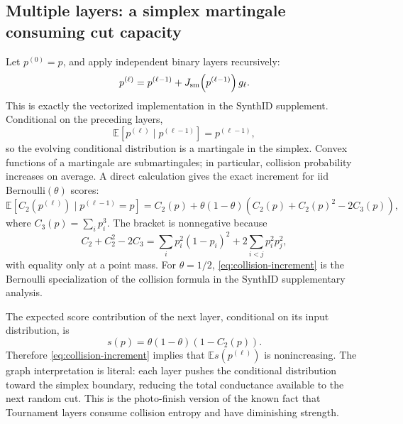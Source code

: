 \documentclass[11pt]{article}
\theoremstyle{definition}
\theoremstyle{remark}
\newcommand{\E}{\mathbb{E}}
\begin{document}
\subsection{Multiple layers: a simplex martingale consuming cut capacity}

Let $p^{(0)}=p$, and apply independent binary layers recursively:
\begin{equation}
p^{(\ell)}=p^{(\ell-1)}
+J_{\rm sm}\!\left(p^{(\ell-1)}\right)g_\ell.
\label{eq:layer-recurrence}
\end{equation}
This is exactly the vectorized implementation in the SynthID supplement. Conditional on the preceding layers,
\begin{equation}
\E[p^{(\ell)}\mid p^{(\ell-1)}]=p^{(\ell-1)},
\label{eq:simplex-martingale}
\end{equation}
so the evolving conditional distribution is a martingale in the simplex. Convex functions of a martingale are submartingales; in particular, collision probability increases on average. A direct calculation gives the exact increment for iid Bernoulli$(\theta)$ scores:
\begin{equation}
\E\!\left[C_2(p^{(\ell)})\mid p^{(\ell-1)}=p\right]
=C_2(p)+\theta(1-\theta)
\left(C_2(p)+C_2(p)^2-2C_3(p)\right),
\label{eq:collision-increment}
\end{equation}
where $C_3(p)=\sum_i p_i^3$. The bracket is nonnegative because
\begin{equation}
C_2+C_2^2-2C_3
=\sum_i p_i^2(1-p_i)^2+2\sum_{i<j}p_i^2p_j^2,
\label{eq:collision-positive}
\end{equation}
with equality only at a point mass. For $\theta=1/2$, \eqref{eq:collision-increment} is the Bernoulli specialization of the collision formula in the SynthID supplementary analysis.

The expected score contribution of the next layer, conditional on its input distribution, is
\begin{equation}
s(p)=\theta(1-\theta)(1-C_2(p)).
\label{eq:next-layer-signal}
\end{equation}
Therefore \eqref{eq:collision-increment} implies that $\E s(p^{(\ell)})$ is nonincreasing. The graph interpretation is literal: each layer pushes the conditional distribution toward the simplex boundary, reducing the total conductance available to the next random cut. This is the photo-finish version of the known fact that Tournament layers consume collision entropy and have diminishing strength.
\end{document}
